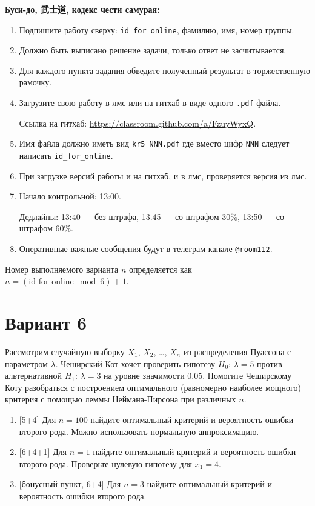 \documentclass[12pt]{article}
\newcommand \id {\mathrm{id}\_\mathrm{for}\_\mathrm{online}}
\begin{document}
\vspace{15mm}


\textbf{Буси-до, 武士道, кодекс чести самурая:}

\vspace{5mm}

\begin{enumerate}
\item Подпишите работу сверху: \verb|id_for_online|, фамилию, имя, номер группы.
\item Должно быть выписано решение задачи, только ответ не засчитывается.
\item Для каждого пункта задания обведите полученный результат в торжественную рамочку.
\item Загрузите свою работу в лмс или на гитхаб в виде одного \verb|.pdf| файла.

Ссылка на гитхаб: \url{https://classroom.github.com/a/FzuyWyxQ}.
\item Имя файла должно иметь вид \verb|kr5_NNN.pdf| где вместо цифр \verb|NNN| следует написать \verb|id_for_online|.
\item При загрузке версий работы и на гитхаб, и в лмс, проверяется версия из лмс. 
\item Начало контрольной: 13:00. 

Дедлайны: 13:40 — без штрафа, 13.45 — со штрафом 30\%, 13:50 — со штрафом 60\%.
\item Оперативные важные сообщения будут в телеграм-канале \verb|@room112|.
\end{enumerate}


\newpage

Номер выполняемого варианта $n$ определяется как $n=(\id \mod 6)+1$. 

\section*{Вариант 6}


Рассмотрим случайную выборку $X_1$, $X_2$, \ldots, $X_n$ из распределения Пуассона с параметром $\lambda$. 
Чеширский Кот хочет проверить гипотезу $H_0$: $\lambda = 5$ против альтернативной $H_1$: $\lambda = 3$ на уровне
значимости $0.05$. Помогите Чеширскому Коту разобраться с построением оптимального (равномерно наиболее мощного)
критерия с помощью леммы Неймана-Пирсона при различных $n$.

\begin{enumerate}
  \item {[5+4]} Для $n=100$ найдите оптимальный критерий и вероятность ошибки второго рода. Можно использовать нормальную аппроксимацию.
  \item {[6+4+1]} Для $n=1$ найдите оптимальный критерий и вероятность ошибки второго рода. Проверьте нулевую гипотезу для $x_1 = 4$. 
  \item {[бонусный пункт, 6+4]} Для $n=3$ найдите оптимальный критерий и вероятность ошибки второго рода.
\end{enumerate}
\end{document}
